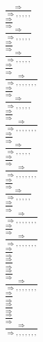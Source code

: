 \documentclass[11pt]{article}
\begin{document}
\begin{center}
\bigskip
\\$\frac{\Rightarrow }{\Rightarrow , , , , , }$
\bigskip
\\$\frac{\Rightarrow }{\Rightarrow }$
\bigskip
\\$\frac{\Rightarrow }{\Rightarrow , , , , , }$
\bigskip
\\$\frac{\Rightarrow }{\Rightarrow }$
\bigskip
\\$\frac{\Rightarrow }{\Rightarrow , , , , , }$
\bigskip
\\$\frac{\Rightarrow }{\Rightarrow }$
\bigskip
\\$\frac{\Rightarrow }{\Rightarrow , , , , , , , }$
\bigskip
\\$\frac{\Rightarrow }{\Rightarrow }$
\bigskip
\\$\frac{\Rightarrow }{\Rightarrow , , , , , }$
\bigskip
\\$\frac{\Rightarrow }{\Rightarrow }$
\bigskip
\\$\frac{\Rightarrow }{\Rightarrow , , , , , , , }$
\bigskip
\\$\frac{\Rightarrow }{\Rightarrow }$
\bigskip
\\$\frac{\Rightarrow }{\Rightarrow , , , , , }$
\bigskip
\\$\frac{\Rightarrow }{\Rightarrow }$
\bigskip
\\$\frac{\Rightarrow }{\Rightarrow , , , , , , , }$
\bigskip
\\$\frac{\Rightarrow }{\Rightarrow }$
\bigskip
\\$\frac{\Rightarrow }{\Rightarrow , , , , , }$
\bigskip
\\$\frac{\Rightarrow }{\Rightarrow }$
\bigskip
\\$\frac{\Rightarrow }{\Rightarrow , , , , , , , }$
\bigskip
\\$\frac{\Rightarrow }{\Rightarrow }$
\bigskip
\\$\frac{\Rightarrow }{\Rightarrow , , , , , , , }$
\bigskip
\\$\frac{\Rightarrow }{\Rightarrow }$
\bigskip
\\$\frac{\Rightarrow }{\Rightarrow }$
\bigskip
\\$\frac{\Rightarrow }{\Rightarrow }$
\bigskip
\\$\frac{\Rightarrow }{\Rightarrow , , , , , , , }$
\bigskip
\\$\frac{\Rightarrow }{\Rightarrow }$
\bigskip
\\$\frac{\Rightarrow }{\Rightarrow }$
\bigskip
\\$\frac{\Rightarrow }{\Rightarrow }$
\bigskip
\\$\frac{\Rightarrow }{\Rightarrow , , , , , , , }$

\end{center}
\end{document}
